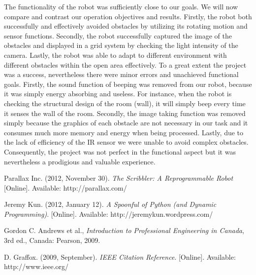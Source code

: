 \documentclass[12pt]{article}
\begin{document}
The functionality of the robot was sufficiently close to our goals. We will now compare and contrast our operation objectives and results. Firstly, the robot both successfully and effectively avoided obstacles by utilizing its rotating motion and sensor functions. Secondly, the robot successfully captured the image of the obstacles and displayed in a grid system by checking the light intensity of the camera. Lastly, the robot was able to adapt to different environment with different obstacles within the open area effectively. To a great extent the project was a success, nevertheless there were minor errors and unachieved functional goals. Firstly, the sound function of beeping was removed from our robot, because it was simply energy absorbing and useless. For instance, when the robot is checking the structural design of the room (wall), it will simply beep every time it senses the wall of the room. Secondly, the image taking function was removed simply because the graphics of each obstacle are not necessary in our task and it consumes much more memory and energy when being processed. Lastly, due to the lack of efficiency of the IR sensor we were unable to avoid complex obstacles. Consequently, the project was not perfect in the functional aspect but it was nevertheless a prodigious and valuable experience.\\

\newpage

\begin{thebibliography}{9}

  Parallax Inc. (2012, November 30). \textit{The Scribbler: A Reprogrammable Robot} [Online]. Available: http://parallax.com/

  Jeremy Kun. (2012, January 12). \textit{A Spoonful of Python (and Dynamic Programming)}. [Online]. Available: http://jeremykun.wordpress.com/

  Gordon C. Andrews et al., \textit{Introduction to Professional Engineering in Canada}, 3rd ed., Canada: Pearson, 2009.

  D. Graffox. (2009, September). \textit{IEEE Citation Reference}. [Online]. Available: http://www.ieee.org/

\end{thebibliography}
\end{document}
